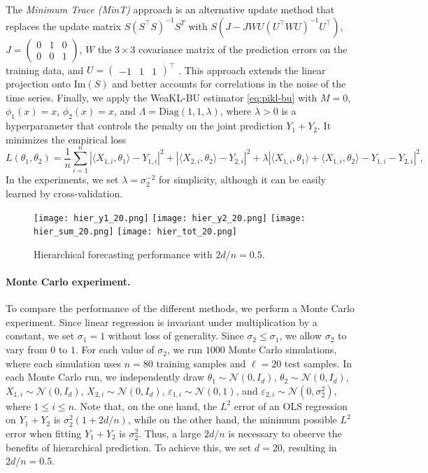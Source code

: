 The \textit{Minimum Trace (MinT)} approach is an alternative update method that replaces the update matrix $S (S^\top S)^{-1} S^T$ with
$S (J-JWU(U^\top W U)^{-1}U^\top)$,
$J = \begin{pmatrix}
    0 & 1 & 0\\
    0 & 0 & 1 
\end{pmatrix}$,
$W$ the $3 \times 3$ covariance matrix of the prediction errors on the training data, and
$U = \begin{pmatrix}
    -1 &1 & 1
\end{pmatrix}^\top$ \citep{Wickramasuriya2019optimal}.
This approach extends the linear projection onto $\mathrm{Im}(S)$ and better accounts for correlations in the noise of the time series. 
Finally, we apply the WeaKL-BU estimator \eqref{eq:pikl-bu} with $M=0$, $\phi_1(x) = x$, $\phi_2(x) = x$, and $\Lambda = \mathrm{Diag}(1,1, \lambda)$, where $\lambda > 0$ is a hyperparameter that controls the penalty on the joint prediction $Y_{1} + Y_{2}$. 
It minimizes the empirical loss
\[
L(\theta_1, \theta_2) = \frac{1}{n}\sum_{i=1}^n |\langle X_{1,i}, \theta_1\rangle- Y_{1,i}|^2 + |\langle X_{2,i}, \theta_2\rangle-Y_{2,i}|^2 + \lambda |\langle X_{1,i}, \theta_1\rangle + \langle X_{1,i}, \theta_2\rangle- Y_{1,i}-Y_{2,i}|^2,
\]
In the experiments, we set $\lambda = \sigma_2^{-2}$ for simplicity, although it can be easily learned by cross-validation.
\begin{figure}
    \centering
    \texttt{[image: hier\_y1\_20.png]}
    \texttt{[image: hier\_y2\_20.png]}
    \texttt{[image: hier\_sum\_20.png]}
    \texttt{[image: hier\_tot\_20.png]}
    \caption{Hierarchical forecasting performance with $2d/n = 0.5$.}
    \label{fig:hier}
\end{figure}

\paragraph{Monte Carlo experiment.} To compare the performance of the different methods, we perform a Monte Carlo experiment. Since linear regression is invariant under multiplication by a constant, we set $\sigma_1=1$ without loss of generality. 
Since $\sigma_2 \leq \sigma_1$, we allow $\sigma_2$ to vary from $0$ to $1$. For each value of $\sigma_2$, we run $1000$ Monte Carlo simulations, where each simulation uses $n = 80$ training samples and $\ell = 20$ test samples. In each Monte Carlo run, we independently draw $\theta_1 \sim \mathcal N(0, I_d)$, $\theta_2 \sim \mathcal N(0, I_d)$, $X_{1,i} \sim \mathcal N(0, I_{ d})$, $X_{2,i} \sim \mathcal N(0, I_{d})$, $\varepsilon_{1,i} \sim \mathcal N(0, 1)$, and $\varepsilon_{2,i} \sim \mathcal N(0, \sigma_2^2)$, where $1 \leq i \leq n$. 
Note that, on the one hand, the $L^2$ error of an OLS regression on $Y_1 + Y_2$ is $\sigma_2^2 (1 + 2d/n)$, while on the other hand, the minimum possible $L^2$ error when fitting  $Y_1 + Y_2$ is $\sigma_2^2$.
Thus,  a large $2d/n$ is necessary to observe the benefits of hierarchical prediction. To achieve this, we set $d = 20$, resulting in $2d/n = 0.5$.

